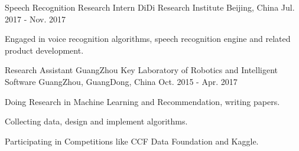 \begin{cventries}
  \cventry
    {Speech Recognition Research Intern}
    {DiDi Research Institute}
    {Beijing, China}
    {Jul. 2017 - Nov. 2017}
    {
      \begin{cvitems}
        \item {Engaged in voice recognition algorithms, speech recognition engine and related product development.}
      \end{cvitems}
    }
  \cventry
    {Research Assistant}
    {GuangZhou Key Laboratory of Robotics and Intelligent Software}
    {GuangZhou, GuangDong, China}
    {Oct. 2015 - Apr. 2017}
    {
      \begin{cvitems}
        \item {Doing Research in Machine Learning and Recommendation, writing papers.}
        \item {Collecting data, design and implement algorithms.}
        \item {Participating in Competitions like CCF Data Foundation and Kaggle.}
      \end{cvitems}
    }
\end{cventries}